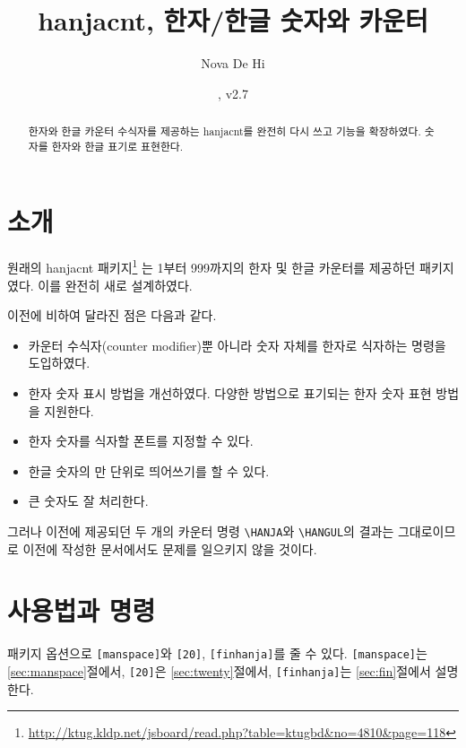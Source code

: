 \documentclass[b5paper,nanum]{oblivoir}
\def\cs#1{\texttt{\textbackslash #1}}
\def\ct#1{\texttt{#1}}
\def\pkg#1{\textsf{#1}}
\begin{document}
\title{hanjacnt, 한자/한글 숫자와 카운터}
\author{Nova De Hi}
\date{\HanjaToday, v2.7}

\maketitle

\begin{abstract}
한자와 한글 카운터 수식자를 제공하는 \pkg{hanjacnt}를 완전히 다시 쓰고
기능을 확장하였다. 숫자를 한자와 한글 표기로 표현한다.
\end{abstract}

\tableofcontents*

\section{소개}

원래의 \pkg{hanjacnt} 패키지\footnote{%
	\url{http://ktug.kldp.net/jsboard/read.php?table=ktugbd&no=4810&page=118}}%
는 1부터 999까지의 한자 및 한글 카운터를 제공하던 패키지였다.
이를 완전히 새로 설계하였다.

이전에 비하여 달라진 점은 다음과 같다.
\begin{itemize}\firmlist
\item 카운터 수식자(counter modifier)뿐 아니라 숫자 자체를 한자로 식자하는 명령을 도입하였다.
\item 한자 숫자 표시 방법을 개선하였다. 다양한 방법으로 표기되는 한자 숫자 표현 방법을 지원한다.
\item 한자 숫자를 식자할 폰트를 지정할 수 있다.
\item 한글 숫자의 만 단위로 띄어쓰기를 할 수 있다.
\item 큰 숫자도 잘 처리한다.
\end{itemize}

그러나 이전에 제공되던 두 개의 카운터 명령 \cs{HANJA}와 \cs{HANGUL}의 결과는 그대로이므로
이전에 작성한 문서에서도 문제를 일으키지 않을 것이다.

\section{사용법과 명령}

\begin{boxedverbatim}
\usepackage{hanjacnt}
\end{boxedverbatim}

패키지 옵션으로 \ct{[manspace]}와 \ct{[20]}, \ct{[finhanja]}를 줄 수 있다. \ct{[manspace]}는 \ref{sec:manspace}절에서, \ct{[20]}은 \ref{sec:twenty}절에서, \ct{[finhanja]}는 \ref{sec:fin}절에서 설명한다.
\end{document}

